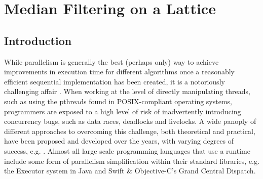 
\newcommand{\hopac}{Hopac}
\chapter{\label{chap:median}Median Filtering on a Lattice}



\section{Introduction}
While parallelism is generally the best (perhaps only) way to achieve improvements in execution time for different algorithms once a reasonably efficient sequential implementation has been created, it is a notoriously challenging affair \cite{Shun2017}.  When working at the level of directly manipulating threads, such as using the pthreads found in POSIX-compliant operating systems, programmers are exposed to a high level of risk of inadvertently introducing concurrency bugs, such as data races, deadlocks and livelocks.  A wide panoply of different approaches to overcoming this challenge, both theoretical and practical, have been proposed and developed over the years, with varying degrees of success, e.g. \cite{Boyapati2002,Bocq2012,Seinstra2004}.  Almost all large scale programming languages that use a runtime include some form of parallelism simplification within their standard libraries, e.g. the Executor system in Java and Swift \& Objective-C's Grand Central Dispatch.

